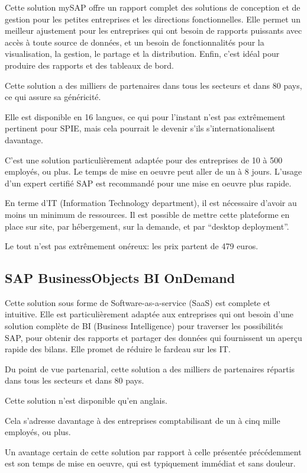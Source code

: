 Cette solution mySAP offre un rapport complet des solutions de conception et de gestion pour les petites entreprises et les directions fonctionnelles. Elle permet un meilleur ajustement pour les entreprises qui ont besoin de rapports puissants avec accès à toute source de données, et un besoin de fonctionnalités pour la visualisation, la gestion, le partage et la distribution. Enfin, c’est idéal pour produire des rapports et des tableaux de bord.

Cette solution a des milliers de partenaires dans tous les secteurs et dans 80 pays, ce qui assure sa généricité.

Elle est disponible en 16 langues, ce qui pour l’instant n’est pas extrêmement pertinent pour SPIE, mais cela pourrait le devenir s’ils s’internationalisent davantage.

C’est une solution particulièrement adaptée pour des entreprises de 10 à 500 employés, ou plus.
Le temps de mise en oeuvre peut aller de un à 8 jours. L’usage d’un expert certifié SAP est recommandé pour une mise en oeuvre plus rapide.

En terme d’IT (Information Technology department), il est nécessaire d’avoir au moins un minimum de ressources. Il est possible de mettre cette plateforme en place sur site, par hébergement, sur la demande, et par “desktop deployment”.

Le tout n’est pas extrêmement onéreux: les prix partent de 479 euros.

\subsection{SAP BusinessObjects BI OnDemand}

Cette solution sous forme de Software-as-a-service (SaaS) est complete et intuitive. Elle est particulièrement adaptée aux entreprises qui ont besoin d’une solution complète de BI (Business Intelligence) pour traverser les possibilités SAP, pour obtenir des rapports et partager des données qui fournissent un aperçu rapide des bilans. Elle promet de réduire le fardeau sur les IT.

Du point de vue partenarial, cette solution a des milliers de partenaires répartis dans tous les secteurs et dans 80 pays.

Cette solution n’est disponible qu’en anglais.

Cela s’adresse davantage à des entreprises comptabilisant de un à cinq mille employés, ou plus.

Un avantage certain de cette solution par rapport à celle présentée précédemment est son temps de mise en oeuvre, qui est typiquement immédiat et sans douleur.

